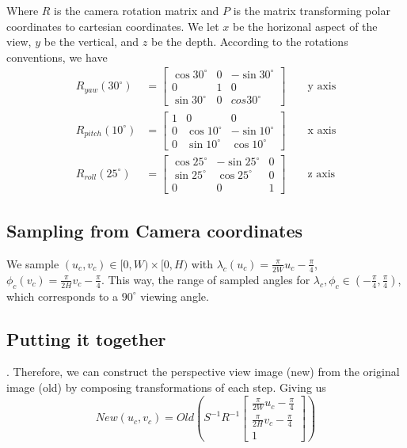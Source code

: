 \documentclass{article}
\begin{document}
Where $R$ is the camera rotation matrix and $P$ is the matrix transforming polar coordinates to cartesian coordinates. 
We let $x$ be the horizonal aspect of the view, $y$ be the vertical, and $z$ be the depth. 
According to the rotations conventions, we have 
\begin{align*}
    R_{yaw}(30^\circ) &= \begin{bmatrix}
        \cos 30^\circ & 0 & -\sin 30^\circ \\
        0 & 1 & 0 \\
        \sin 30^\circ & 0 & cos 30^\circ
    \end{bmatrix} && \text{ y axis} \\
    R_{pitch}(10^\circ) &= \begin{bmatrix}
        1 & 0 & 0 \\
        0 & \cos 10^\circ & -\sin 10^\circ \\
        0 & \sin 10^\circ & \cos 10^\circ
    \end{bmatrix} && \text{ x axis} \\ 
    R_{roll}(25^\circ) &= \begin{bmatrix}
        \cos 25^\circ & -\sin 25^\circ & 0 \\
        \sin 25^\circ & \cos 25^\circ & 0 \\
        0 & 0 & 1
    \end{bmatrix} && \text{ z axis}
\end{align*}

\subsection{Sampling from Camera coordinates}
We sample $(u_c, v_c) \in [0, W) \times [0, H)$ with 
$\lambda_c(u_c) = \frac{\pi}{2W}u_c - \frac{\pi}{4}$, $\phi_c(v_c) = \frac{\pi}{2H}v_c - \frac{\pi}{4}$. 
This way, the range of sampled angles for $\lambda_c, \phi_c \in (-\frac{\pi}{4}, \frac{\pi}{4})$, which corresponds to a $90^\circ$ viewing angle. 

\subsection{Putting it together}. 
Therefore, we can construct the perspective view image (new) from the original image (old) by composing transformations of each step. 
Giving us 
\[
New(u_c, v_c) = Old(
S^{-1}
R^{-1}
\begin{bmatrix}
    \frac{\pi}{2W}u_c - \frac{\pi}{4} \\ 
    \frac{\pi}{2H}v_c - \frac{\pi}{4} \\ 
    1
\end{bmatrix}
)
\] 
\end{document}
